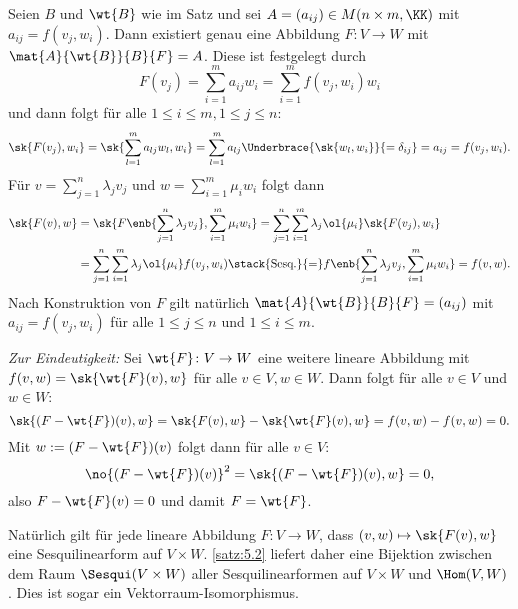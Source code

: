 \begin{beweis}
	Seien $B$ und $\wt{B}$ wie im Satz und sei $A = (a_{ij}) \in M(n \times m,\KK)$ mit $a_{ij} = f(v_j,w_i)$.
	Dann existiert genau eine Abbildung $F\colon V \rightarrow W$ mit $\mat{A}{\wt{B}}{B}{F} = A$.
	Diese ist festgelegt durch
	\[
		F(v_j) = \sum_{i=1}^{m} a_{ij} w_i = \sum_{i=1}^{m} f(v_j,w_i) w_i
	\]
	und dann folgt für alle $1 \leq i \leq m, 1 \leq j \leq n$:
	\[
		\sk{F(v_j),w_i} = \sk{\sum_{l=1}^{m} a_{lj} w_l,w_i} = \sum_{l=1}^{m} a_{lj} \Underbrace{\sk{w_l,w_i}}{=\delta_{ij}} = a_{ij} = f(v_j,w_i).
	\]
	\newpage
	Für $v = \sum_{j=1}^{n} \lambda_j v_j$ und $w = \sum_{i=1}^{m} \mu_i w_i$ folgt dann
	\begin{align*}
		\sk{F(v),w} &= \sk{F \enb{\sum_{j=1}^{n} \lambda_j v_j}, \sum_{i=1}^{m} \mu_i w_i} = \sum_{j=1}^{n} \sum_{i=1}^{m} \lambda_j \ol{\mu_i} \sk{F(v_j),w_i} \\
		&= \sum_{j=1}^{n} \sum_{i=1}^{m} \lambda_j \ol{\mu_i} f(v_j,w_i) \stack{\text{Sesq.}}{=} f \enb{\sum_{j=1}^{n} \lambda_j v_j , \sum_{i=1}^{m} \mu_i w_i} = f(v,w).
	\end{align*}
	Nach Konstruktion von $F$ gilt natürlich $\mat{A}{\wt{B}}{B}{F} = (a_{ij})$ mit $a_{ij} = f(v_j,w_i)$ für alle $1 \leq j \leq n$ und $1 \leq i \leq m$.
	
	\textit{Zur Eindeutigkeit:} Sei $\wt{F} \colon V \rightarrow W$ eine weitere lineare Abbildung mit $f(v,w) = \sk{\wt{F}(v),w}$ für alle $v \in V, w \in W$.
	Dann folgt für alle $v \in V$ und $w \in W$:
	\[
		\sk{(F-\wt{F})(v),w} = \sk{F(v),w} - \sk{\wt{F}(v),w} = f(v,w) - f(v,w) = 0.
	\]
	Mit $w := (F-\wt{F})(v)$ folgt dann für alle $v \in V$:
	\[
		\no{(F-\wt{F})(v)}^2 = \sk{(F - \wt{F})(v),w} = 0,
	\]
	also $F - \wt{F}(v) = 0$ und damit $F = \wt{F}$. 
\end{beweis}

\begin{bemerkung}
	\label{bem:5.3}
	Natürlich gilt für jede lineare Abbildung $F \colon V \rightarrow W$, dass $(v,w) \mapsto \sk{F(v),w}$ eine Sesquilinearform auf $V \times W$.
	\autoref{satz:5.2} liefert daher eine Bijektion zwischen dem Raum $\Sesqui(V \times W)$ aller Sesquilinearformen auf $V \times W$ und $\Hom(V,W)$. 
	Dies ist sogar ein Vektorraum-Isomorphismus.
\end{bemerkung}


